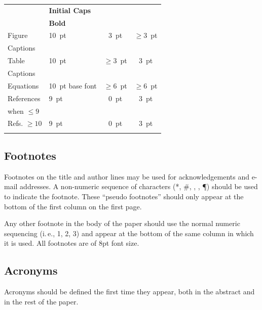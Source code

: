 \documentclass[a4paper,
               nospread,     %
               ]{jacow}
\begin{document}
\begin{table}[h!b]
\begin{tabular}{llcc}
                            & \textbf{Initial Caps}       &                 &      \\
		& \textbf{Bold}               &                 &      \\[5pt]
		Figure        & \SI{10}{pt}                 & \SI{3}{pt}      & $\ge$\SI{3}{pt}  \\
		Captions      &                             &                 &      \\[5pt]
		Table         & \SI{10}{pt}                 & $\ge$\SI{3}{pt} & \SI{3}{pt}  \\
		Captions      &                             &                 &      \\[5pt]
		Equations     & \SI{10}{pt} base font       & $\ge$\SI{6}{pt}     & $\ge$\SI{6}{pt} \\[5pt]
		References      & \SI{9}{pt}				& \SI{0}{pt}      & \SI{3}{pt} \\
        when $\le9$ 	& \verb||	&                 &  \\[5pt]
        Refs. $\ge10$ 	& \SI{9}{pt}				& \SI{0}{pt}      & \SI{3}{pt}  \\
                		& \verb||	&    &    \\
		\bottomrule   %
	\end{tabular}
\end{table}

\subsection{Footnotes}

Footnotes on the title and author lines may be used for acknowledgements
and e-mail addresses. A non-numeric sequence of characters (*, \#,
\dag, \ddag, \P) should be used to indicate the footnote.
These “pseudo footnotes” should only
appear at the bottom of the first column on the first page.

Any other footnote in the body of the paper should
use the normal numeric sequencing (i.\,e., 1, 2, 3)
and appear at the bottom of the same column in which
it is used.  All footnotes are of 8pt font size.

\subsection{Acronyms}

Acronyms should be defined the first time they appear, 
both in the abstract and in the rest of the paper. 
\end{document}
